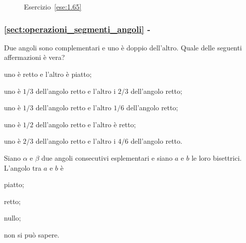 \begin{inaccessibleblock}
 \begin{figure}[htb]
 \centering
 \caption{Esercizio~\ref{ese:1.65}}%
\end{figure}
\end{inaccessibleblock}

\begingroup
\hypersetup{linkcolor=black}
\subsubsection*{\ref{sect:operazioni_segmenti_angoli} - 
}
\endgroup

\begin{esercizio}
Due angoli sono complementari e uno è doppio dell'altro. Quale delle 
seguenti affermazioni è vera?
\begin{enumeratea}
\item uno è retto e l'altro è piatto;
\item uno è \(1/3\) dell'angolo retto e l'altro i \(2/3\) dell'angolo 
retto;
\item uno è \(1/3\) dell'angolo retto e l'altro \(1/6\) dell'angolo retto;
\item uno è \(1/2\) dell'angolo retto e l'altro è retto;
\item uno è \(2/3\) dell'angolo retto e l'altro i \(4/6\) dell'angolo 
retto.
\end{enumeratea}
\end{esercizio}

\begin{esercizio}
Siano \(\alpha\) e \(\beta\) due angoli consecutivi esplementari e siano 
\(a\) e \(b\) le loro bisettrici. L'angolo tra \(a\) e \(b\) è
\begin{multicols}{2}
\begin{enumeratea}
\item piatto;
\item retto;
\item nullo;
\item non si può sapere.
\end{enumeratea}
\end{multicols}
\end{esercizio}

